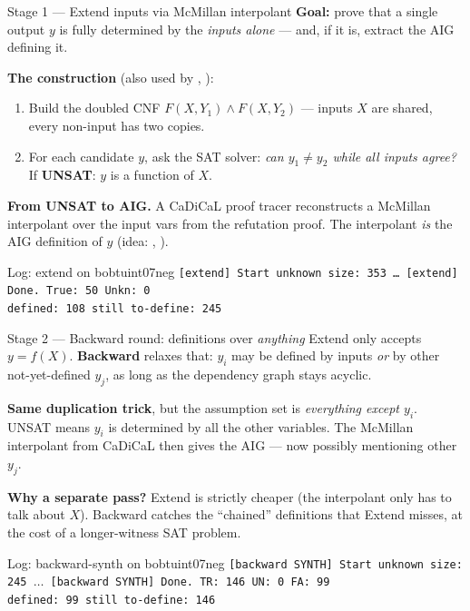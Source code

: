 \documentclass[aspectratio=169]{beamer}
\begin{document}
\begin{frame}{Stage 1 --- Extend inputs via McMillan interpolant}
  \textbf{Goal:} prove that a single output $y$ is fully determined by the
  \emph{inputs alone} --- and, if it is, extract the AIG defining it.
  \medskip

  \textbf{The construction} (also used by
  \cite{soos2020bird}, \cite{durand2025fbcounting}):
  \begin{enumerate}\setlength{\itemsep}{1pt}
    \item Build the \alert{doubled CNF} $F(X, Y_1) \wedge F(X, Y_2)$ ---
          inputs $X$ are shared, every non-input has two copies.
    \item For each candidate $y$, ask the SAT solver:
          \emph{can $y_1 \neq y_2$ while all inputs agree?}
          If \textbf{UNSAT}: $y$ is a function of $X$.
  \end{enumerate}
  \medskip

  \textbf{From UNSAT to AIG.} A CaDiCaL proof tracer reconstructs a
  \alert{McMillan interpolant} over the input vars from the refutation
  proof. The interpolant \emph{is} the AIG definition of $y$
  (idea: \cite{mcmillan2003interpolation},
  \cite{jiang2009interpolating}).
  \medskip

  \begin{exampleblock}{\small Log: extend on bobtuint07neg}
  \scriptsize
  \texttt{[extend] Start unknown size: 353 \dots
   [extend] Done.  True: 50 Unkn: 0 \\defined: 108 still to-define: 245}
  \end{exampleblock}
\end{frame}

\begin{frame}{Stage 2 --- Backward round: definitions over \emph{anything}}
  Extend only accepts $y = f(X)$. \textbf{Backward} relaxes that:
  $y_i$ may be defined by inputs
  \emph{or} by other not-yet-defined $y_j$, as long as the dependency
  graph stays acyclic.
  \medskip

  \textbf{Same duplication trick}, but the assumption set is
  \emph{everything except $y_i$}. UNSAT means $y_i$ is determined by all
  the other variables. The McMillan interpolant from CaDiCaL then gives
  the AIG --- now possibly mentioning other $y_j$.
  \medskip

  \textbf{Why a separate pass?} Extend is strictly cheaper (the
  interpolant only has to talk about $X$). Backward catches the
  ``chained'' definitions that Extend misses, at the cost of a
  longer-witness SAT problem.
  \medskip

  \begin{exampleblock}{\small Log: backward-synth on bobtuint07neg}
  \scriptsize
  \texttt{[backward SYNTH] Start unknown size: 245 $\dots$
   [backward SYNTH] Done.  TR: 146 UN: 0 FA: 99\\
   defined: 99 still to-define: 146}
  \end{exampleblock}
  \medskip
\end{frame}
\end{document}
